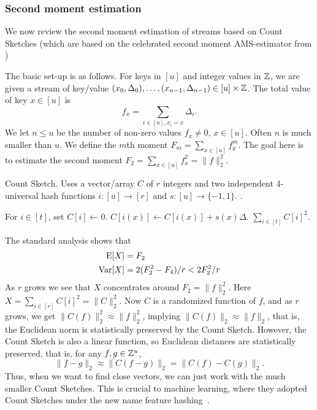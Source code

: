 \subsubsection{Second moment estimation}\label{sec:count-sketch}
We now review the second moment estimation of streams based on Count Sketches \cite{charikar04count-sketch} (which are based on the
celebrated second moment AMS-estimator from \cite{alon96frequency})

The basic set-up is as follows.  For keys in $[u]$ and integer values in $\mathbb Z$, we are given a stream of key/value $(x_0,\Delta_0),\ldots, (x_{n-1},\Delta_{n-1})\in [u]\times\mathbb Z$. The
total value of key $x\in[u]$ is
\[f_x=\sum_{i\in[n],x_i=x} \Delta_i.\]
We let $n\leq u$ be  the number of non-zero values
$f_x\neq 0$, $x\in [u]$. Often $n$ is much smaller than $u$.
We define the $m$th moment $F_m = \sum_{x\in [u]}f_y^m$. The goal here is to
estimate the second moment $F_2 = \sum_{x\in [u]}f_x^2=\|f\|^2_2$. 

\begin{algorithm}[H]
   \caption{\label{alg:count-sketch} Count Sketch. Uses a
      vector/array $C$ of $r$ integers and two independent
      4-universal hash functions $i:[u]\to[r]$ and $s:[u]\to\{-1,1\}$.
   .}
   \begin{algorithmic}
         \State For $i\in[t]$, set $C[i]\gets 0$.
      \EndProcedure
         \State $C[i(x)]\gets C[i(x)]+s(x) \Delta$. 
      \EndProcedure
         \State \Return $\sum_{i\in[t]} C[i]^2$.
      \EndProcedure
   \end{algorithmic}
\end{algorithm}
The standard analysis \cite{charikar04count-sketch} shows that 
\begin{align}
   \operatorname*{E}[X]&= F_2 \label{eq:E-F2}\\
   \operatorname*{Var}[X]&=2(F_2^2 - F_4)/r<2F_2^2/r \label{eq:V-F2}
\end{align}
As $r$ grows we see that $X$ concentrates around $F_2=\|f\|^2_2$. Here
$X=\sum_{i\in[r]} C[i]^2=\|C\|^2_2$. Now $C$ is a randomized function
of $f$, and as $r$ grows, we get $\|C(f)\|^2_2\approx\|f\|^2_2$,
implying $\|C(f)\|_2\approx\|f\|_2$, that is, the Euclidean norm is
statistically preserved by the Count Sketch. However, the Count Sketch
is also a linear function, so Euclidean distances are statistically
preserved, that is, for any $f,g\in \mathbb Z^u$,
\[\|f-g\|_2\approx \|C(f-g)\|_2=\|C(f)-C(g)\|_2.\]
Thus, when we want to find close vectors, we can just work with the
much smaller Count Sketches. This is crucial to machine learning,
where they adopted Count Sketches under the new name feature hashing~\cite{WDLSA09}.

